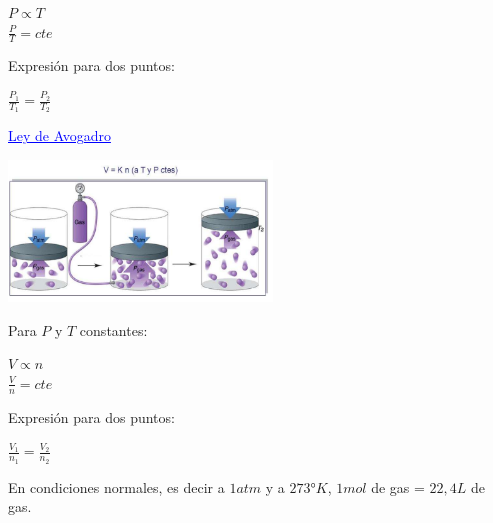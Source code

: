             \begin{center}
                $P \propto T$ \\
                $\frac{P}{T} = cte$
            \end{center}
            \sangria{} Expresión para dos puntos:
            \begin{center} $\frac{P_1}{T_1} = \frac{P_2}{T_2}$ \end{center}
            \begin{center} \textcolor{blue}{\underline{Ley de Avogadro}} \end{center}
            \begin{center} \includegraphics[width=7cm]{./imagenes/dibujoLeyAvogadro.png} \end{center}
            \sangria{} Para $P$ y $T$ constantes:
            \begin{center}
                $V \propto n$ \\
                $\frac{V}{n} = cte$
            \end{center}
            \sangria{} Expresión para dos puntos:
            \begin{center} $\frac{V_1}{n_1} = \frac{V_2}{n_2}$ \end{center}
            \sangria{} En condiciones normales, es decir a $1atm$ y a $\ang{273} K$, $1mol$ de gas = $22,4 L$ de gas.
